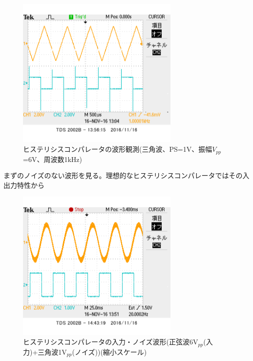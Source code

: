 \documentclass[11pt,a4j]{jsarticle}
\begin{document}
 \begin{figure}[htbp]
  \centering
  \includegraphics[width=8cm,clip]{1_2_histeri_Vth1f1V6sankaku_ViVo.png}
  \caption{ヒステリシスコンパレータの波形観測(三角波、PS=1V、振幅$V_{pp}$=6V、周波数1kHz)}
  \label{fig:histeri_1-1}
 \end{figure}
 	
 	まずのノイズのない波形を見る。理想的なヒステリシスコンパレータではその入出力特性から
 	
 \begin{figure}[htbp]
  \centering
  \includegraphics[width=8cm,clip]{1_2_noise_before_6-1_BigScale.png}
  \caption{ヒステリシスコンパレータの入力・ノイズ波形(正弦波6V$_{pp}$(入力)+三角波1V$_{pp}$(ノイズ))(縮小スケール)}
  \label{fig:noise_before_6-1_big}
 \end{figure}
 
\end{document}
